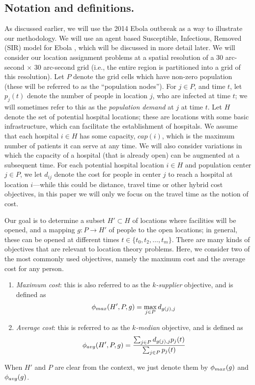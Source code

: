 

\subsection*{Notation and definitions.}
As discussed earlier, we will use the 2014 Ebola outbreak as a way to illustrate our methodology.
We will use an agent based Susceptible, Infectious, Removed (SIR) model for Ebola
\cite{rivers:2014ea}, which will be discussed in more detail later.
We will consider our location assignment problems at a spatial resolution of a 
30 arc-second $\times$ 30 arc-second grid (i.e., the entire region is partitioned into a grid of this resolution).
Let $P$ denote the grid cells which have non-zero
population (these will be referred to as the ``population nodes'').
For $j\in P$, and time $t$, let $p_j(t)$ denote the number of people in location $j$, who are infected at time $t$;
we will sometimes refer to this as the \emph{population demand} at $j$ at time $t$.
Let $H$ denote the set of potential hospital locations; these are
locations with some basic infrastructure, which can facilitate the establishment
of hospitals. We assume that each hospital $i\in H$ has some capacity, $cap(i)$, which is the maximum number of patients it can serve at any time. We will also consider variations in which the capacity of a hospital (that is already open) can be augmented at a subsequent time. For each potential hospital location $i\in H$ and population center $j\in P$, we let $d_{ij}$ denote the cost for people in center $j$ to
reach a hospital at location $i$---while this could be distance, travel time or other
hybrid cost objectives, in this paper we will only
we focus on the travel time as the notion of cost.



Our goal is to determine a subset $H'\subset H$ of locations where facilities will be opened, and a mapping 
$g: P \rightarrow H'$ of people to the open locations; in general, these can be opened at different times
$t \in \{t_0, t_2, \ldots, t_m\}$.
There are many kinds of objectives that are relevant to location theory problems. Here,
we consider two of the most commonly used objectives, namely the maximum cost 
and the average cost for any person. 

\begin{enumerate}
\item
\emph{Maximum cost}: this is also referred to as the \emph{$k$-supplier} objective, and is defined as
\[
\phi_{max}(H', P, g)=\max_{j\in P} d_{g(j),j}
\]
\item
\emph{Average cost}: this is referred to as the \emph{$k$-median} objective, and is defined as
\[
\phi_{avg}(H', P, g) = \frac{\sum_{j\in P} d_{g(j),j}p_j(t)}{\sum_{j\in P}p_j(t)}
\]
\end{enumerate}
When $H'$ and $P$ are clear from the context, we just denote them by $\phi_{max}(g)$ and $\phi_{avg}(g)$.

